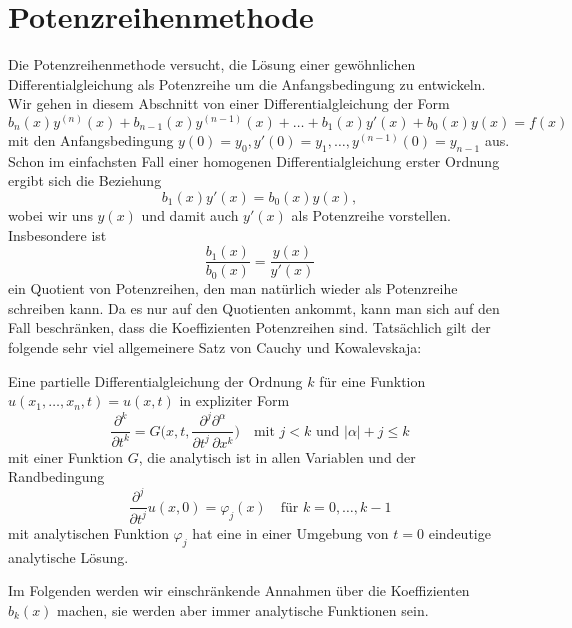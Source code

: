 %
%
%
\section{Potenzreihenmethode
\label{buch:differentialgleichungen:section:potenzreihenmethode}}
Die Potenzreihenmethode versucht, die Lösung einer gewöhnlichen
Differentialgleichung als Potenzreihe um die Anfangsbedingung zu
entwickeln.
%
Wir gehen in diesem Abschnitt von einer Differentialgleichung der
Form
\begin{equation}
b_n(x)y^{(n)}(x)
+
b_{n-1}(x)y^{(n-1)}(x)
+
\dots
+
b_1(x)y'(x)
+
b_0(x)y(x)
=
f(x)
\label{buch:differentialgleichungen:eqn:potenzreihendgl}
\end{equation}
mit den Anfangsbedingung $y(0)=y_0, y'(0)=y_1,\dots,y^{(n-1)}(0)=y_{n-1}$ aus.
Schon im einfachsten Fall einer homogenen Differentialgleichung erster
Ordnung ergibt sich die Beziehung
\[
b_1(x) y'(x) = b_0(x)y(x),
\]
wobei wir uns $y(x)$ und damit auch $y'(x)$ als Potenzreihe vorstellen.
Insbesondere ist 
\[
\frac{b_1(x)}{b_0(x)} = \frac{y(x)}{y'(x)}
\]
ein Quotient von Potenzreihen, den man natürlich wieder als 
Potenzreihe schreiben kann.
Da es nur auf den Quotienten ankommt, kann man sich auf den Fall
beschränken, dass die Koeffizienten Potenzreihen sind.
Tatsächlich gilt der folgende sehr viel allgemeinere Satz von
Cauchy und Kowalevskaja:


\begin{satz}
%
%
Eine partielle Differentialgleichung der Ordnung $k$ für eine
Funktion $u(x_1,\dots,x_n,t)=u(x,t)$ 
in expliziter Form
\[
\frac{\partial^k}{\partial t^k}
=
G\biggl(x,t,
\frac{\partial^j\partial^\alpha}{\partial t^j\,\partial x^k}
\biggr)
\quad\text{mit $j<k$ und $|\alpha|+j\le k$}
\]
mit einer Funktion $G$, die analytisch ist in allen Variablen
und der Randbedingung
\[
\frac{\partial^j}{\partial t^j}u(x,0)
=
\varphi_j(x)\quad\text{für $k=0,\dots,k-1$}
\]
mit analytischen Funktion $\varphi_j$ hat eine in einer Umgebung von 
$t=0$ eindeutige analytische Lösung.
\end{satz}

Im Folgenden werden wir einschränkende Annahmen über
die Koeffizienten $b_k(x)$ machen, sie werden aber immer
analytische Funktionen sein.

